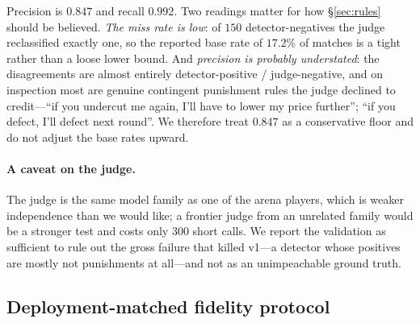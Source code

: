 Precision is $0.847$ and recall $0.992$. Two readings matter for how
\S\ref{sec:rules} should be believed. \emph{The miss rate is low}: of $150$
detector-negatives the judge reclassified exactly one, so the reported base rate of
$17.2\%$ of matches is a tight rather than a loose lower bound. And \emph{precision is
probably understated}: the disagreements are almost entirely detector-positive /
judge-negative, and on inspection most are genuine contingent punishment rules the
judge declined to credit---``if you undercut me again, I'll have to lower my price
further''; ``if you defect, I'll defect next round''. We therefore treat $0.847$ as a
conservative floor and do not adjust the base rates upward.

\paragraph{A caveat on the judge.}
The judge is the same model family as one of the arena players, which is weaker
independence than we would like; a frontier judge from an unrelated family would be a
stronger test and costs only $300$ short calls. We report the validation as sufficient
to rule out the gross failure that killed v1---a detector whose positives are mostly
not punishments at all---and not as an unimpeachable ground truth.

\subsection{Deployment-matched fidelity protocol}
\label{sec:protocol}


